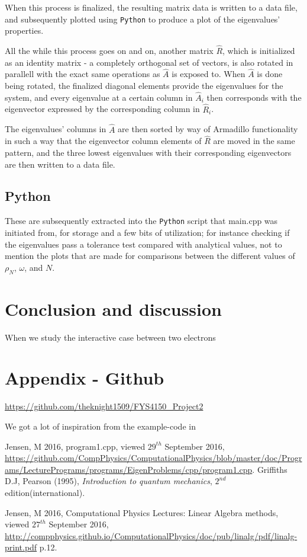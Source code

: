 \documentclass[11pt,a4paper,notitlepage]{article}
\begin{document}
  When this process is finalized, the resulting matrix data is written to a data file, and subsequently plotted using \verb|Python| to produce a plot of the eigenvalues' properties.
  
  All the while this process goes on and on, another matrix $\hat{R}$, which is initialized as an identity matrix - a completely orthogonal set of vectors, is also rotated in parallell with the exact same operations as $\hat{A}$ is exposed to. When $\hat{A}$ is done being rotated, the finalized diagonal elements provide the eigenvalues for the system, and every eigenvalue at a certain column in $\hat{A}_i$ then corresponds with the eigenvector expressed by the corresponding column in $\hat{R}_i$.
 
 The eigenvalues' columns in $\hat{A}$ are then sorted by way of Armadillo functionality in such a way that the eigenvector column elements of $\hat{R}$ are moved in the same pattern, and the three lowest eigenvalues with their corresponding eigenvectors are then written to a data file.
 
 \subsection{Python}
 These are subsequently extracted into the \verb|Python| script that main.cpp was initiated from, for storage and a few bits of utilization; for instance checking if the eigenvalues pass a tolerance test compared with analytical values, not to mention the plots that are made for comparisons between the different values of $\rho_N$, $\omega$, and $N$.

\section{Conclusion and discussion}
When we study the interactive case between two electrons 

\section{Appendix - Github} \label{section:github}
\url{https://github.com/theknight1509/FYS4150_Project2}


We got a lot of inspiration from the example-code in \cite[web-site]{example_code}

\begin{thebibliography}{9}
  Jensen, M 2016,
  program1.cpp,
  viewed $29^{th}$ September 2016,
  \url{https://github.com/CompPhysics/ComputationalPhysics/blob/master/doc/Programs/LecturePrograms/programs/EigenProblems/cpp/program1.cpp}.
  Griffiths D.J, 
  Pearson (1995),
  \emph{Introduction to quantum mechanics},
  $2^{nd}$ edition(international).
  
	Jensen, M 2016, 
	Computational Physics Lectures: Linear
Algebra methods, 
	viewed $27^{th}$ September 2016, 
	\url{http://compphysics.github.io/ComputationalPhysics/doc/pub/linalg/pdf/linalg-print.pdf} p.12. 

\end{thebibliography}
\end{document}

